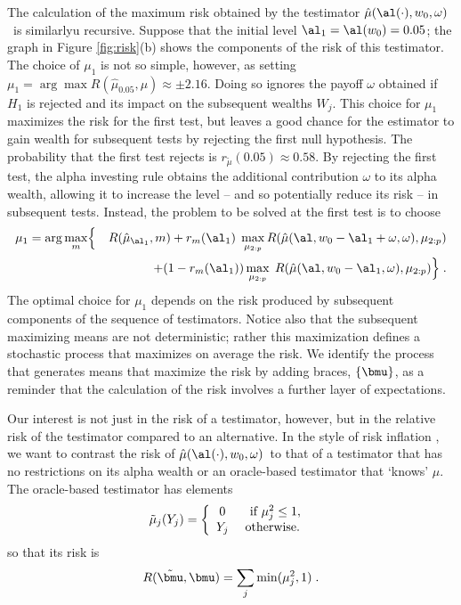 \documentclass[12pt]{article}
\newcommand{\test}{\mbox{$\hat\mu(\al(\cdot),w_0,\omega)$}}
\begin{document}
 The calculation of the maximum risk obtained by the testimator \test\ is
 similarlyu recursive.  Suppose that the initial level $\al_1 = \al(w_0)=0.05$;
 the graph in Figure \ref{fig:risk}(b) shows the components of the risk of this
 testimator.  The choice of $\mu_1$ is not so simple, however, as setting $\mu_1
 = \arg \max R(\hat\mu_{0.05},\mu) \approx \pm 2.16$.  Doing so ignores the
 payoff $\omega$ obtained if $H_1$ is rejected and its impact on the subsequent
 wealths $W_j$.  This choice for $\mu_1$ maximizes the risk for the first test,
 but leaves a good chance for the estimator to gain wealth for subsequent tests
 by rejecting the first null hypothesis.  The probability that the first test
 rejects is $r_{\tilde\mu}(0.05) \approx 0.58$.  By rejecting the first test,
 the alpha investing rule obtains the additional contribution $\omega$ to its
 alpha wealth, allowing it to increase the level -- and so potentially reduce
 its risk -- in subsequent tests.  Instead, the problem to be solved at the
 first test is to choose
 \begin{eqnarray*}
    \mu_1 = \arg \max_{m} & \Bigl\{ & R(\hat\mu_{\al_1},m) \Bigr. 
        + r_{m}(\al_1) \; \max_{\mu_{2:p}} 
              R(\hat\mu(\al,w_0-\al_1+\omega,\omega),\mu_{2:p})\cr
    & & + \Bigl. (1-r_{m}(\al_1)) \max_{\mu_{2:p}} \; 
              R(\hat\mu(\al,w_0-\al_1,\omega),\mu_{2:p}) \Bigr\} \;.
 \end{eqnarray*}
 The optimal choice for $\mu_1$ depends on the risk produced by subsequent
 components of the sequence of testimators.  Notice also that the subsequent
 maximizing means are not deterministic; rather this maximization defines a
 stochastic process that maximizes on average the risk.  We identify the process
 that generates means that maximize the risk by adding braces, $\{\bmu\}$, as a
 reminder that the calculation of the risk involves a further layer of
 expectations.  


 Our interest is not just in the risk of a testimator, however, but in the
 relative risk of the testimator compared to an alternative.  In the style of
 risk inflation , we want to contrast the risk of \test\ to that of a
 testimator that has no restrictions on its alpha wealth or an oracle-based
 testimator that `knows' $\mu$.  The oracle-based testimator has elements
 \begin{equation}
   \tilde\mu_j(Y_j) = \left\{ \begin{array}{cc} 
                       0    & \mbox{ if } \mu_j^2 \le 1,        \cr
                       Y_j  & \mbox{ otherwise. }
                \end{array} \right.
 \label{eq:muTilde}
 \end{equation}
 so that its risk is 
 \begin{equation}
    R(\tilde{\bmu},\bmu) = \sum_j \min(\mu_j^2,1) \;.   
 \label{eq:riskMuTilde}
 \end{equation}
\end{document}
